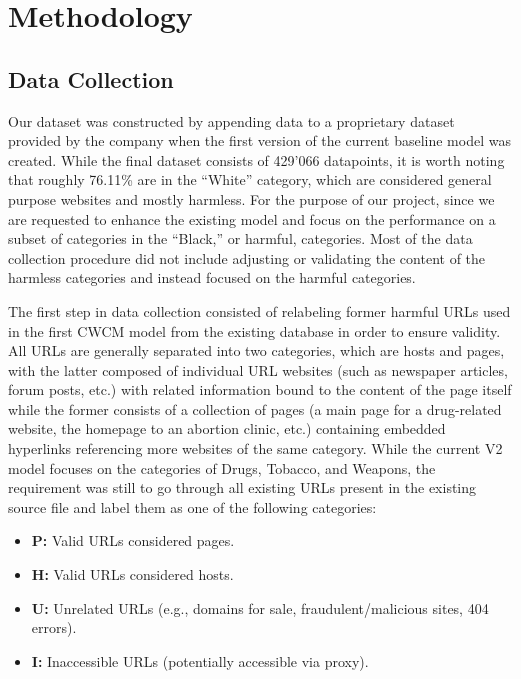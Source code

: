 \documentclass[
  titlepage]{article}
\providecommand{\tightlist}{%
  \setlength{\itemsep}{0pt}\setlength{\parskip}{0pt}}
\begin{document}
\section{Methodology}\label{methodology}

\subsection{Data Collection}\label{data-collection}

Our dataset was constructed by appending data to a proprietary dataset
provided by the company when the first version of the current baseline
model was created. While the final dataset consists of 429'066
datapoints, it is worth noting that roughly 76.11\% are in the ``White''
category, which are considered general purpose websites and mostly
harmless. For the purpose of our project, since we are requested to
enhance the existing model and focus on the performance on a subset of
categories in the ``Black,'' or harmful, categories. Most of the data
collection procedure did not include adjusting or validating the content
of the harmless categories and instead focused on the harmful
categories.

The first step in data collection consisted of relabeling former harmful
URLs used in the first CWCM model from the existing database in order to
ensure validity. All URLs are generally separated into two categories,
which are hosts and pages, with the latter composed of individual URL
websites (such as newspaper articles, forum posts, etc.) with related
information bound to the content of the page itself while the former
consists of a collection of pages (a main page for a drug-related
website, the homepage to an abortion clinic, etc.) containing embedded
hyperlinks referencing more websites of the same category. While the
current V2 model focuses on the categories of Drugs, Tobacco, and
Weapons, the requirement was still to go through all existing URLs
present in the existing source file and label them as one of the
following categories:

\begin{itemize}
\tightlist
\item
  \textbf{P:} Valid URLs considered pages.
\item
  \textbf{H:} Valid URLs considered hosts.
\item
  \textbf{U:} Unrelated URLs (e.g., domains for sale,
  fraudulent/malicious sites, 404 errors).
\item
  \textbf{I:} Inaccessible URLs (potentially accessible via proxy).
\end{itemize}
\end{document}
